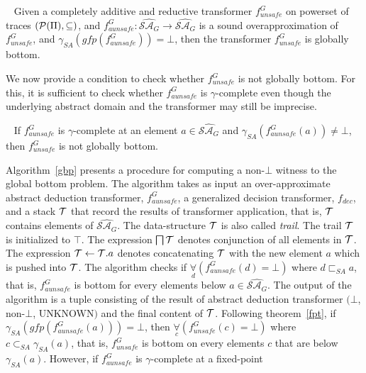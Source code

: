 \begin{theorem}~\label{fpt}
Given a completely additive and reductive transformer $f_{unsafe}^G$ on powerset of traces 
$(\mathcal{P}(\Pi), \subseteq)$, and 
$f_{aunsafe}^G \colon \widehat{\mathcal{SA}_{G}} \rightarrow \widehat{\mathcal{SA}_{G}}$ is 
a sound overapproximation of $f_{unsafe}^G$, and $\gamma_{SA}(gfp(f_{aunsafe}^G)) = \bot$, 
then the transformer $f_{unsafe}^G$ is globally bottom.
\end{theorem}

We now provide a condition to check whether $f_{unsafe}^G$ is not globally bottom. 
For this, it is 
sufficient to check whether $f_{aunsafe}^G$ is $\gamma$-complete even though the 
underlying abstract domain and the transformer may still be imprecise. 

\begin{proposition}~\label{gcf}
If $f_{aunsafe}^G$ is $\gamma$-complete at an element 
$a \in \widehat{\mathcal{SA}_G}$ and $\gamma_{SA}(f_{aunsafe}^G(a)) \neq \bot$, 
then $f_{unsafe}^G$ is not globally bottom.
\end{proposition}
%
Algorithm~\ref{gbp} presents a procedure for computing a non-$\bot$ witness 
to the global bottom problem. The algorithm takes as input an over-approximate 
abstract deduction transformer, $f_{aunsafe}^G$, a generalized decision transformer, 
$f_{dec}$, and a stack $\mathcal{T}$ that record the results of transformer application, 
that is, $\mathcal{T}$ contains elements of $\widehat{\mathcal{SA}_G}$.  The data-structure 
$\mathcal{T}$ is also called \emph{trail}. The trail $\mathcal{T}$ 
is initialized to $\top$.  The expression $\bigsqcap \mathcal{T}$ denotes conjunction of 
all elements in $\mathcal{T}$.  The expression $\mathcal{T} \leftarrow \mathcal{T}.a$ denotes concatenating 
$\mathcal{T}$ with the new element $a$ which is pushed into $\mathcal{T}$. 
The algorithm  checks if $\underset{d}{\forall}(f_{aunsafe}^G(d) = \bot)$ where $d \sqsubset_{SA} a$, 
that is, $f_{aunsafe}^G$ is bottom for every elements below $a \in \widehat{\mathcal{SA}_G}$.  
The output of the algorithm is a tuple consisting of the result of abstract deduction 
transformer $(\bot$, non-$\bot$, UNKNOWN$)$ and the final content of $\mathcal{T}$. 
Following theorem~\ref{fpt}, if 
$\gamma_{SA}(gfp(f_{aunsafe}^G(a))) = \bot$, then $\underset{c}{\forall}(f_{unsafe}^G(c)=\bot)$ 
where $c \subset_{SA} \gamma_{SA}(a)$, that is, $f_{unsafe}^G$ is bottom on every elements $c$ 
that are below $\gamma_{SA}(a)$.  However, if $f_{aunsafe}^G$ is $\gamma$-complete at a fixed-point 
